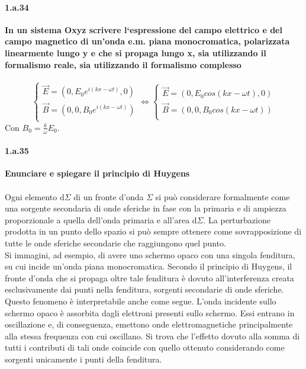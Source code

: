 \documentclass[twoside]{article}
\begin{document}
\paragraph{1.a.34} \textbf{In un sistema Oxyz scrivere l‘espressione del campo elettrico e del campo
magnetico di un’onda e.m. piana monocromatica, polarizzata linearmente lungo y
e che si propaga lungo x, sia utilizzando il formalismo reale, sia utilizzando il
formalismo complesso}\\
\\
\begin{equation}
    \begin{cases}
    \vec{E}=(0,E_0e^{i(kx-\omega t)},0)\\
    \vec{B}=(0,0,B_0e^{i(kx-\omega t)})\\
    \end{cases} \Longleftrightarrow \begin{cases}
    \vec{E}=(0,E_0cos(kx-\omega t),0)\\
    \vec{B}=(0,0,B_0cos(kx-\omega t))\\
    \end{cases}
\end{equation}
Con $B_0=\frac{k}{\omega}E_0$.\\

\paragraph{1.a.35} \textbf{Enunciare e spiegare il principio di Huygens}\\
\\
Ogni elemento d$\Sigma$ di un fronte d'onda $\Sigma$  si può considerare formalmente come una sorgente secondaria di onde sferiche in fase con la primaria e di ampiezza proporzionale a quella dell'onda primaria e all'area d$\Sigma$. La perturbazione prodotta in un punto dello spazio si può sempre ottenere come sovrapposizione di tutte le onde sferiche secondarie che raggiungono quel punto.\\
Si immagini, ad esempio, di avere uno schermo opaco con una singola fenditura, su cui incide un'onda piana monocromatica. Secondo il principio di Huygens, il fronte d'onda che si propaga oltre tale fenditura è dovuto all'interferenza creata esclusivamente dai punti nella fenditura, sorgenti secondarie di onde sferiche. Questo fenomeno è interpretabile anche come segue. L'onda incidente sullo schermo opaco è assorbita dagli elettroni presenti sullo schermo. Essi entrano in oscillazione e, di conseguenza, emettono onde elettromagnetiche principalmente alla stessa frequenza con cui oscillano. Si trova che l'effetto dovuto alla somma di tutti i contributi di tali onde coincide con quello ottenuto considerando come sorgenti unicamente i punti della fenditura.\\
\end{document}
